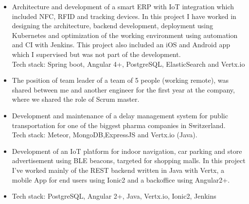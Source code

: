 \documentclass[10pt,a4paper]{altacv}
\begin{document}

\begin{fullwidth}
\makecvheader
\end{fullwidth}


\begin{itemize}
\justifying
\item Architecture and development of a smart ERP with IoT integration which
  included NFC, RFID and tracking devices. In this project I have worked in
  designing the architecture, backend development, deployment using Kubernetes
  and optimization of the working environment using automation and CI with
  Jenkins. This project also included an iOS and Android app which I supervised
  but was not part of the development.
  \\Tech stack: Spring boot, Angular 4+, PostgreSQL, ElasticSearch and Vertx.io
\item The position of team leader of a team of 5 people (working remote), was
  shared between me and another engineer for the first year at the company, where we shared the role of Scrum master.
\item Development and maintenance of a delay management system for public
  transportation for one of the biggest pharma companies in Switzerland.
  \\Tech stack: Meteor, MongoDB,ExpressJS and Vertx.io (Java).  
\end{itemize} 

\divider

\begin{itemize}
\justifying 
\item Development of an IoT platform for indoor navigation, car parking and store advertisement using BLE beacons, targeted for shopping malls.
In this project I've worked mainly of the REST backend written in Java with Vertx, a mobile App for end users using Ionic2 and a backoffice using Angular2+.  
\item Tech stack: PostgreSQL, Angular 2+, Java, Vertx.io, Ionic2, Jenkins
\end{itemize}
\end{document}
